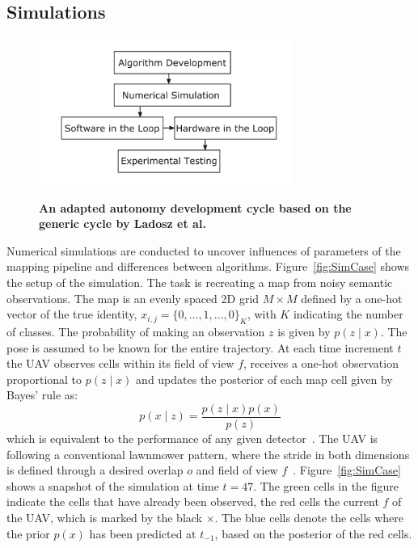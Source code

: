 \documentclass[twocolumn,letterpaper]{IEEEAerospaceCLS}  %
\begin{document}
\subsection{Simulations} \label{ssec:MetSim}
\begin{figure}
    \centering
    \includegraphics[width=3.25in]{2-3DevelopmentCycle.png}\\
    \caption{\bf{An adapted autonomy development cycle based on the generic cycle by Ladosz et al.~\protect\cite{ladosz_generic_2019}}}
    \label{fig:DevProcess}
\end{figure}
Numerical simulations are conducted to uncover influences of parameters of the mapping pipeline and differences between algorithms. Figure~\ref{fig:SimCase} shows the setup of the simulation. The task is recreating a map from noisy semantic observations. The map is an evenly spaced 2D grid $M \times M$ defined by a one-hot vector of the true identity, $x_{i,j} = \{0,..., 1, ..., 0\}_K$, with $K$ indicating the number of classes. The probability of making an observation $z$ is given by $p(z\mid x)$. The pose is assumed to be known for the entire trajectory. At each time increment $t$ the UAV observes cells within its field of view $f$, receives a one-hot observation proportional to $p(z\mid x)$ and updates the posterior of each map cell given by Bayes' rule as:
\begin{equation} \label{eq:Bayes}
    p(x\mid z) = \frac{p(z\mid x) p(x)}{p(z)}
\end{equation}
which is equivalent to the performance of any given detector~\cite{alom_history_2018}.
The UAV is following a conventional lawnmower pattern, where the stride in both dimensions is defined through a desired overlap $o$ and field of view $f$~\cite{shetty_implementation_2020}. Figure~\ref{fig:SimCase} shows a snapshot of the simulation at time $t=47$. The green cells in the figure indicate the cells that have already been observed, the red cells the current $f$ of the UAV, which is marked by the black $\times$. The blue cells denote the cells where the prior $p(x)$ has been predicted at $t_{-1}$, based on the posterior of the red cells.\\ 
\end{document}

